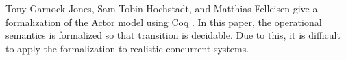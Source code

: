 Tony Garnock-Jones, Sam Tobin-Hochstadt, and Matthias Felleisen give a formalization of the Actor model using Coq \cite{Garnock-Jones:2014aa}.
In this paper, the operational semantics is formalized so that transition is decidable.
Due to this, it is difficult to apply the formalization to realistic concurrent systems.
